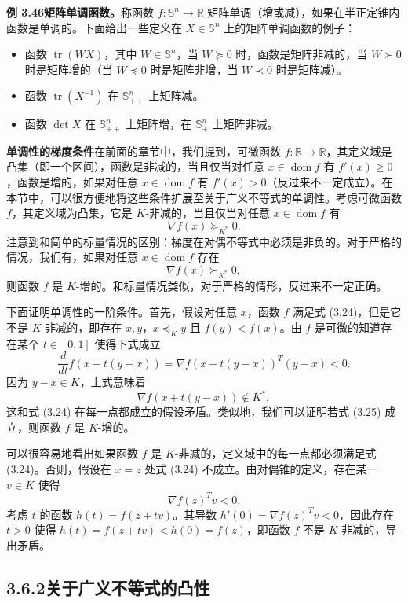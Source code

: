 \documentclass[UTF8,12pt,a4paper,fontset=fandol]{ctexart}
\DeclareMathOperator{\dom}{dom}
\begin{document}
\noindent\textbf{例 3.46\quad 矩阵单调函数。}\quad 称函数 $f:\mathbb{S}^n\to\mathbb{R}$ 矩阵单调（增或减），如果在半正定锥内函数是单调的。下面给出一些定义在 $X\in\mathbb{S}^n$ 上的矩阵单调函数的例子：
\begin{itemize}
\item 函数 $\operatorname{tr}(WX)$，其中 $W\in\mathbb{S}^n$，当 $W\succeq0$ 时，函数是矩阵非减的，当 $W\succ0$ 时是矩阵增的（当 $W\preceq0$ 时是矩阵非增，当 $W\prec0$ 时是矩阵减）。
\item 函数 $\operatorname{tr}(X^{-1})$ 在 $\mathbb{S}_{++}^n$ 上矩阵减。
\item 函数 $\det X$ 在 $\mathbb{S}_{++}^n$ 上矩阵增，在 $\mathbb{S}_+^n$ 上矩阵非减。
\end{itemize}

\noindent\textbf{单调性的梯度条件}\quad 在前面的章节中，我们提到，可微函数 $f:\mathbb{R}\to\mathbb{R}$，其定义域是凸集（即一个区间），函数是非减的，当且仅当对任意 $x\in\dom f$ 有 $f'(x)\geq0$，函数是增的，如果对任意 $x\in\dom f$ 有 $f'(x)>0$（反过来不一定成立）。在本节中，可以很方便地将这些条件扩展至关于广义不等式的单调性。考虑可微函数 $f$，其定义域为凸集，它是 $K$-非减的，当且仅当对任意 $x\in\dom f$ 有
\begin{equation}
\nabla f(x)\succeq_{K^*}0.
\tag{3.24}
\end{equation}
注意到和简单的标量情况的区别：梯度在对偶不等式中必须是非负的。对于严格的情况，我们有，如果对任意 $x\in\dom f$ 存在
\begin{equation}
\nabla f(x)\succ_{K^*}0,
\tag{3.25}
\end{equation}
则函数 $f$ 是 $K$-增的。和标量情况类似，对于严格的情形，反过来不一定正确。

下面证明单调性的一阶条件。首先，假设对任意 $x$，函数 $f$ 满足式 (3.24)，但是它不是 $K$-非减的，即存在 $x,y$，$x\preceq_K y$ 且 $f(y)<f(x)$。由 $f$ 是可微的知道存在某个 $t\in[0,1]$ 使得下式成立
\[
\frac{d}{dt}f(x+t(y-x))=\nabla f(x+t(y-x))^T(y-x)<0.
\]
因为 $y-x\in K$，上式意味着
\[
\nabla f(x+t(y-x))\notin K^*,
\]
这和式 (3.24) 在每一点都成立的假设矛盾。类似地，我们可以证明若式 (3.25) 成立，则函数 $f$ 是 $K$-增的。

可以很容易地看出如果函数 $f$ 是 $K$-非减的，定义域中的每一点都必须满足式 (3.24)。否则，假设在 $x=z$ 处式 (3.24) 不成立。由对偶锥的定义，存在某一 $v\in K$ 使得
\[
\nabla f(z)^Tv<0.
\]
考虑 $t$ 的函数 $h(t)=f(z+tv)$。其导数 $h'(0)=\nabla f(z)^Tv<0$，因此存在 $t>0$ 使得 $h(t)=f(z+tv)<h(0)=f(z)$，即函数 $f$ 不是 $K$-非减的，导出矛盾。

\subsection*{3.6.2\quad 关于广义不等式的凸性}
\end{document}
